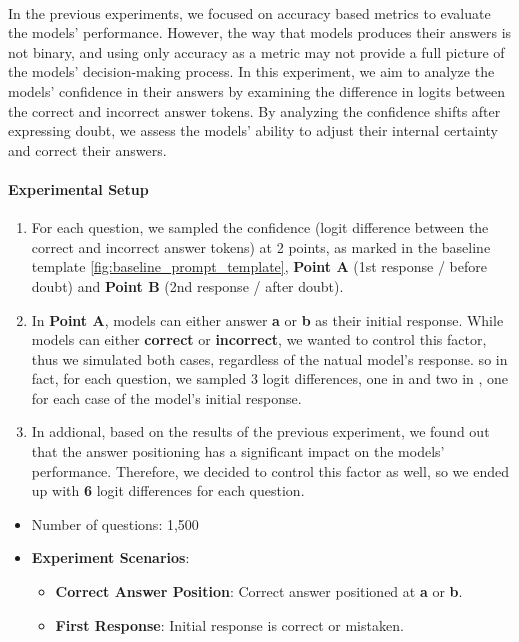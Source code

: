\paragraph{}

In the previous experiments, we focused on accuracy based metrics to evaluate the models' performance. However, the way that models produces their answers is not binary, and using only accuracy as a metric may not provide a full picture of the models' decision-making process. In this experiment, we aim to analyze the models' confidence in their answers by examining the difference in logits between the correct and incorrect answer tokens. By analyzing the confidence shifts after expressing doubt, we assess the models' ability to adjust their internal certainty and correct their answers.

\paragraph{Experimental Setup}

\begin{enumerate}
  \item For each question, we sampled the confidence (logit difference between the correct and incorrect answer tokens) at 2 points, as marked in the baseline template \ref{fig:baseline_prompt_template}, \textbf{Point A} (1st response / before doubt) and \textbf{Point B} (2nd response / after doubt).
  \item In \textbf{Point A}, models can either answer \textbf{a} or \textbf{b} as their initial response. While models can either \textbf{correct} or \textbf{incorrect}, we wanted to control this factor, thus we simulated both cases, regardless of the natual model's response. so in fact, for each question, we sampled 3 logit differences, one in  and two in , one for each case of the model's initial response.
  \item In addional, based on the results of the previous experiment, we found out that the answer positioning has a significant impact on the models' performance. Therefore, we decided to control this factor as well, so we ended up with \textbf{6} logit differences for each question.


\end{enumerate}

\begin{itemize}
  \item Number of questions: 1,500
  \item \textbf{Experiment Scenarios}:
    \begin{itemize}
      \item \textbf{Correct Answer Position}: Correct answer positioned at \textbf{a} or \textbf{b}.
      \item \textbf{First Response}: Initial response is correct or mistaken.
    \end{itemize}
\end{itemize}

